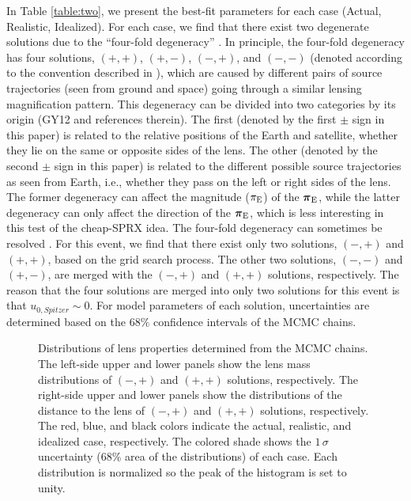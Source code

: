 \documentclass[10pt]{emulateapj}
\newcommand{\pivec}{\mbox{\boldmath $\pi$}}
\begin{document}
 In Table \ref{table:two}, we present the best-fit parameters for each case (Actual, Realistic, Idealized). 
For each case, we find that there exist two degenerate solutions due to the ``four-fold degeneracy'' 
\citep{refsdal66,gould94}. In principle, the four-fold degeneracy has four solutions, $(+,+)$, $(+,-)$, 
$(-,+)$, and $(-,-)$ (denoted according to the convention described in \citealt{zhu15}), which are caused by 
different pairs of source trajectories (seen from ground and space) going through a similar 
lensing magnification pattern. This degeneracy can be divided into two categories by its origin 
(GY12 and references therein). The first (denoted by the first $\pm$ sign in this paper) is related to the relative 
positions of the Earth and satellite, whether they lie on the same or opposite sides of the lens. The other (denoted 
by the second $\pm$ sign in this paper) is related to the different possible source trajectories as seen from Earth, 
i.e., whether they pass on the left or right sides of the lens. The former degeneracy can affect the magnitude ($\pi_{\rm E}$) 
of the $\pivec_{\rm E}$, while the latter degeneracy can only affect the direction of the $\pivec_{\rm E}$, 
which is less interesting in this test of the cheap-SPRX idea. The four-fold degeneracy can sometimes be resolved 
\citep[e.g.,][]{chung17, han16, han17, shin17, udalski15b, yee15a}. For this event, we find that there exist 
only two solutions, $(-,+)$ and $(+,+)$, based on the grid search process. The other two solutions, 
$(-,-)$ and $(+,-)$, are merged with the $(-,+)$ and $(+,+)$ solutions, respectively. 
The reason that the four solutions are merged into only two solutions for this event is that $u_{0,Spitzer}\sim 0$. 
For model parameters of each solution, uncertainties are determined based on the $68\%$ confidence 
intervals of the MCMC chains.

\begin{figure*}[htb!]
\caption{
Distributions of lens properties determined from the MCMC chains.
The left-side upper and lower panels show the lens mass distributions of $(-,+)$ and $(+,+)$ solutions, 
respectively. The right-side upper and lower panels show the distributions of the distance to the lens 
of $(-,+)$ and $(+,+)$ solutions, respectively. The red, blue, and black colors indicate the actual, 
realistic, and idealized case, respectively. The colored shade shows the $1\,\sigma$ uncertainty ($68\%$ 
area of the distributions) of each case. Each distribution is normalized so the peak of the histogram is 
set to unity.
\label{fig:four}}
\end{figure*}
\end{document}
